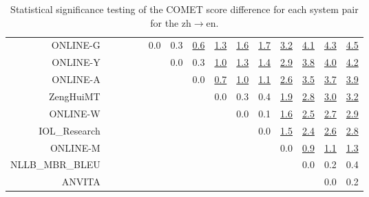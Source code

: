 \documentclass[11pt]{article}
\begin{document}
\begin{sidewaystable}
\begin{center}
{\begin{tabular}{rcccccccccccccc}
ONLINE-G   &  &  &  &  & \cellcolor{red!0} 0.0 & \cellcolor{red!50} 0.3 & \cellcolor{red!70} \underline{0.6} & \cellcolor{red!70} \underline{1.3} & \cellcolor{red!70} \underline{1.6} & \cellcolor{red!70} \underline{1.7} & \cellcolor{red!70} \underline{3.2} & \cellcolor{red!70} \underline{4.1} & \cellcolor{red!70} \underline{4.3} & \cellcolor{red!70} \underline{4.5}\\ 
ONLINE-Y   &  &  &  &  &  & \cellcolor{red!0} 0.0 & \cellcolor{red!60} 0.3 & \cellcolor{red!70} \underline{1.0} & \cellcolor{red!70} \underline{1.3} & \cellcolor{red!70} \underline{1.4} & \cellcolor{red!70} \underline{2.9} & \cellcolor{red!70} \underline{3.8} & \cellcolor{red!70} \underline{4.0} & \cellcolor{red!70} \underline{4.2}\\ 
ONLINE-A   &  &  &  &  &  &  & \cellcolor{red!0} 0.0 & \cellcolor{red!70} \underline{0.7} & \cellcolor{red!70} \underline{1.0} & \cellcolor{red!70} \underline{1.1} & \cellcolor{red!70} \underline{2.6} & \cellcolor{red!70} \underline{3.5} & \cellcolor{red!70} \underline{3.7} & \cellcolor{red!70} \underline{3.9}\\ 
ZengHuiMT   &  &  &  &  &  &  &  & \cellcolor{red!0} 0.0 & \cellcolor{red!0} 0.3 & \cellcolor{red!50} 0.4 & \cellcolor{red!70} \underline{1.9} & \cellcolor{red!70} \underline{2.8} & \cellcolor{red!70} \underline{3.0} & \cellcolor{red!70} \underline{3.2}\\ 
ONLINE-W   &  &  &  &  &  &  &  &  & \cellcolor{red!0} 0.0 & \cellcolor{red!0} 0.1 & \cellcolor{red!70} \underline{1.6} & \cellcolor{red!70} \underline{2.5} & \cellcolor{red!70} \underline{2.7} & \cellcolor{red!70} \underline{2.9}\\ 
IOL\_Research &    &  &  &  &  &  &  &  &  & \cellcolor{red!0} 0.0 & \cellcolor{red!70} \underline{1.5} & \cellcolor{red!70} \underline{2.4} & \cellcolor{red!70} \underline{2.6} & \cellcolor{red!70} \underline{2.8}\\ 
ONLINE-M &    &  &  &  &  &  &  &  &  &  & \cellcolor{red!0} 0.0 & \cellcolor{red!70} \underline{0.9} & \cellcolor{red!70} \underline{1.1} & \cellcolor{red!70} \underline{1.3}\\ 
NLLB\_MBR\_BLEU &    &  &  &  &  &  &  &  &  &  &  & \cellcolor{red!0} 0.0 & \cellcolor{red!0} 0.2 & \cellcolor{red!60} 0.4\\ 
ANVITA &  &   &  &  &  &  &  &  &  &  &  &  & \cellcolor{red!0} 0.0 & \cellcolor{red!0} 0.2\\ 
\bottomrule 
\end{tabular} }
\caption{Statistical significance testing of the COMET score difference for each system pair for the zh$\rightarrow$en.} 
 \end{center} \end{sidewaystable} 
 
\end{document}
